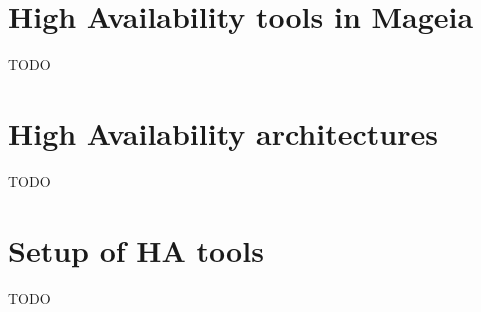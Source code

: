 \documentclass[a4paper,12pt]{article}
\begin{document}
\tableofcontents
\cleardoublepage

\section{High Availability tools in Mageia}
TODO

\section{High Availability architectures}
TODO

\section{Setup of HA tools}
TODO
\end{document}
